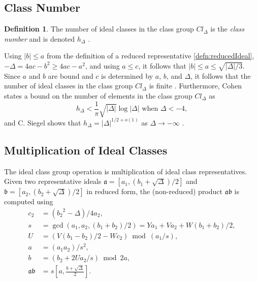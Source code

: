 \documentclass{ucalgthes1}
\theoremstyle{definition}
\newtheorem{defn}[thm]{Definition}
\begin{document}
\subsection{Class Number}
\label{subsec:classNumber}

\begin{defn}
The number of ideal classes in the class group $Cl_\Delta$ is the \emph{class number} and is denoted $h_\Delta$ \cite[p.153]{Jacobson2009}.
\end{defn}

Using $|b| \le a$ from the definition of a reduced representative \ref{defn:reducedIdeal}, $-\Delta = 4ac - b^2 \ge 4ac -a^2$, and using $a \le c$, it follows that $|b| \le a \le \sqrt{|\Delta|/3}$.  Since $a$ and $b$ are bound and $c$ is determined by $a$, $b$, and $\Delta$, it follows that the number of ideal classes in the class group $Cl_\Delta$ is finite \cite[p.153]{Jacobson2009}.  Furthermore, Cohen \cite[p.247]{Crandall2001} states a bound on the number of elements in the class group $Cl_\Delta$ as
\begin{equation}
\label{eq:hDelta}
	h_\Delta < \frac{1}{\pi} \sqrt{|\Delta|}\log{|\Delta|} \textrm{ when } \Delta < -4,
\end{equation}
and C. Siegel shows that $h_\Delta = |\Delta|^{1/2 + o(1)}$ as $\Delta \rightarrow -\infty$ \cite[p.247]{Crandall2001}.

\subsection{Multiplication of Ideal Classes}
\label{subsec:idealMultiply}

The ideal class group operation is multiplication of ideal class representatives. Given two representative ideals $\mathfrak a = [a_1, (b_1 + \sqrt{\Delta})/2]$ and $\mathfrak b = [a_2, (b_2 + \sqrt{\Delta})/2]$ in reduced form, the (non-reduced) product $\mathfrak a \mathfrak b$ is computed using
\begin{align}
	c_2 & = ({b_2}^2-\Delta)/4a_2, \\
	s & = \gcd(a_1, a_2, (b_1+b_2)/2) = Ya_1 + Va_2 + W(b_1+b_2)/2,    \label{eq:idealProductS} \\
	U & = (V(b_1-b_2)/2 - Wc_2) \bmod{(a_1/s)},                        \label{eq:idealProductU} \\
	a & = (a_1a_2)/s^2,                                                \label{eq:idealProductA} \\
	b & = (b_2 + 2Ua_2/s) \bmod{2a},                                   \label{eq:idealProductB} \\
	\mathfrak a \mathfrak b & = s\left[a, \frac{b + \sqrt{\Delta}}{2}\right].
\end{align}
\end{document}
